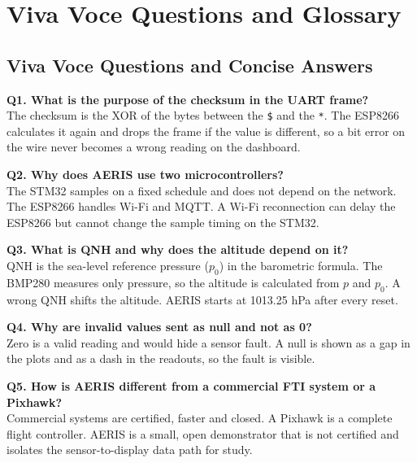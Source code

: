 \documentclass[12pt,a4paper]{report}
\begin{document}
\appendix
\chapter{Viva Voce Questions and Glossary}
\section{Viva Voce Questions and Concise Answers}
\noindent\textbf{Q1. What is the purpose of the checksum in the UART frame?}\\
The checksum is the XOR of the bytes between the \texttt{\$} and the \texttt{*}. The ESP8266 calculates it again and drops the frame if the value is different, so a bit error on the wire never becomes a wrong reading on the dashboard.

\medskip\noindent\textbf{Q2. Why does AERIS use two microcontrollers?}\\
The STM32 samples on a fixed schedule and does not depend on the network. The ESP8266 handles Wi-Fi and MQTT. A Wi-Fi reconnection can delay the ESP8266 but cannot change the sample timing on the STM32.

\medskip\noindent\textbf{Q3. What is QNH and why does the altitude depend on it?}\\
QNH is the sea-level reference pressure ($p_0$) in the barometric formula. The BMP280 measures only pressure, so the altitude is calculated from $p$ and $p_0$. A wrong QNH shifts the altitude. AERIS starts at 1013.25 hPa after every reset.

\medskip\noindent\textbf{Q4. Why are invalid values sent as null and not as 0?}\\
Zero is a valid reading and would hide a sensor fault. A null is shown as a gap in the plots and as a dash in the readouts, so the fault is visible.

\medskip\noindent\textbf{Q5. How is AERIS different from a commercial FTI system or a Pixhawk?}\\
Commercial systems are certified, faster and closed. A Pixhawk is a complete flight controller. AERIS is a small, open demonstrator that is not certified and isolates the sensor-to-display data path for study.
\end{document}

